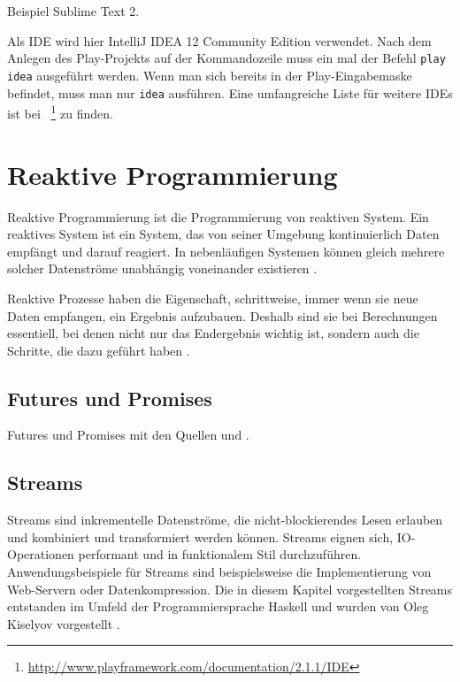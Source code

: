 \documentclass[draft=false
              ,paper=a4
              ,twoside=false
              ,fontsize=11pt
              ,headsepline
              ,BCOR10mm
              ,DIV11
              ]{scrbook}
\begin{document}
Beispiel Sublime Text 2.

Als IDE wird hier IntelliJ IDEA 12 Community Edition verwendet.
Nach dem Anlegen des Play-Projekts auf der Kommandozeile muss ein mal der Befehl \lstinline|play idea| ausgeführt werden.
Wenn man sich bereits in der Play-Eingabemaske befindet, muss man nur \lstinline|idea| ausführen.
Eine umfangreiche Liste für weitere IDEs ist bei \citealt{ide}~\footnote{\url{http://www.playframework.com/documentation/2.1.1/IDE}} zu finden.








\chapter{Reaktive Programmierung} %
\label{cha:reaktive_programmierung}

Reaktive Programmierung ist die Programmierung von reaktiven System.
Ein reaktives System ist ein System, das von seiner Umgebung kontinuierlich Daten empfängt und darauf reagiert.
In nebenläufigen Systemen können gleich mehrere solcher Datenströme unabhängig voneinander existieren \cite[vgl.][S.~1]{reactive_programming}.

Reaktive Prozesse haben die Eigenschaft, schrittweise, immer wenn sie neue Daten empfangen, ein Ergebnis aufzubauen.
Deshalb sind sie bei Berechnungen essentiell, bei denen nicht nur das Endergebnis wichtig ist, sondern auch die Schritte, die dazu geführt haben \cite[vgl.][S.~2]{reactive_programming1}.


\section{Futures und Promises} %
\label{sec:futures_und_promises}

Futures und Promises mit den Quellen \citealt{haller2013} und \citealt{typesafe2013}.



\section{Streams} %
\label{sec:streams}

Streams sind inkrementelle Datenströme, die nicht-blockierendes Lesen erlauben und kombiniert und transformiert werden können.
Streams eignen sich, IO-Operationen performant und in funktionalem Stil durchzuführen.
Anwendungsbeispiele für Streams sind beispielsweise die Implementierung von Web-Servern oder Datenkompression.
Die in diesem Kapitel vorgestellten Streams entstanden im Umfeld der Programmiersprache Haskell und wurden von Oleg Kiselyov  vorgestellt \cite[vgl.][S.~19]{monad_reader}.
\end{document}
